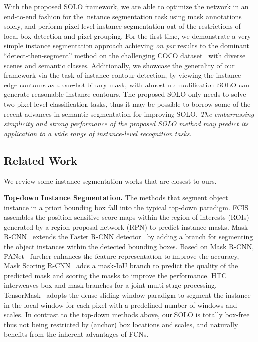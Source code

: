 \documentclass[runningheads]{llncs}
\def\OurMethod{{SOLO}\xspace}
\newcommand{\myparagraph}[1]{{ \noindent \bf #1}}
\begin{document}
With the  proposed \OurMethod framework, we are able to optimize the network
in an end-to-end
fashion
for the instance segmentation task
using mask
annotations solely, and perform pixel-level instance segmentation out of the restrictions of local box detection and pixel grouping.
For the first time, we demonstrate a very simple instance segmentation approach achieving {\it on par} results to the dominant ``detect-then-segment'' method
on the challenging COCO dataset~\cite{coco} with diverse scenes and
semantic classes.
Additionally,
we showcase the generality of our framework via the task of instance contour detection, by viewing the instance edge contours as a one-hot binary mask, with almost no
modification \OurMethod can generate reasonable instance contours.
The proposed \OurMethod  only needs to solve two pixel-level classification tasks,
thus it may be possible to borrow some of the recent advances in semantic segmentation
for improving \OurMethod.
\textit{The embarrassing simplicity and strong performance of the proposed
\OurMethod  method
may predict its application to a wide range of instance-level recognition
tasks}.









\subsection{Related Work}
 We review some instance segmentation works that are closest to ours.

\myparagraph{Top-down Instance Segmentation.}
The methods that segment object instance in a priori bounding box fall into the typical top-down paradigm.
FCIS~\cite{fcis} assembles the position-sensitive score maps within the  region-of-interests (ROIs) generated by a region proposal network (RPN) to predict instance masks.
Mask R-CNN~\cite{maskrcnn} extends the Faster R-CNN detector~\cite{fasterrcnn} by adding a branch for segmenting the object instances within the detected bounding boxes.
Based on Mask R-CNN, PANet~\cite{panet} further enhances the feature representation to improve the accuracy,
Mask Scoring R-CNN~\cite{maskscoringrcnn} adds a mask-IoU branch to predict the quality of the predicted mask and scoring the masks to improve the performance.
HTC~\cite{chen2019hybrid} interweaves box and mask branches for a joint multi-stage processing.
TensorMask~\cite{Chen_2019_ICCV} adopts the dense sliding window paradigm to segment the instance in the local window for each pixel with a predefined number of windows  and scales.
In contrast to the top-down methods above, our \OurMethod is totally box-free thus not being restricted by (anchor) box locations and scales, and naturally benefits from the inherent advantages of FCNs.
\end{document}

